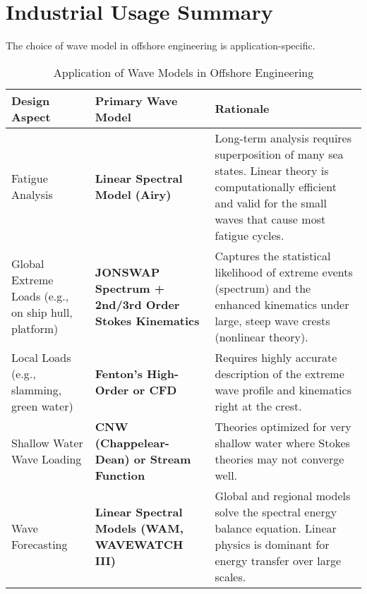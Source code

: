 \documentclass[11pt,a4paper]{article}
\begin{document}
\section{Industrial Usage Summary}
The choice of wave model in offshore engineering is application-specific.
\begin{table}[H]
\centering
\caption{Application of Wave Models in Offshore Engineering}
\begin{tabular}{@{}p{3cm}p{7cm}p{3cm}@{}}
\toprule
Design Aspect & Primary Wave Model & Rationale \\
\midrule
Fatigue Analysis & \textbf{Linear Spectral Model (Airy)} & Long-term analysis requires superposition of many sea states. Linear theory is computationally efficient and valid for the small waves that cause most fatigue cycles. \\
Global Extreme Loads (e.g., on ship hull, platform) & \textbf{JONSWAP Spectrum + 2nd/3rd Order Stokes Kinematics} & Captures the statistical likelihood of extreme events (spectrum) and the enhanced kinematics under large, steep wave crests (nonlinear theory). \\
Local Loads (e.g., slamming, green water) & \textbf{Fenton's High-Order or CFD} & Requires highly accurate description of the extreme wave profile and kinematics right at the crest. \\
Shallow Water Wave Loading & \textbf{CNW (Chappelear-Dean) or Stream Function} & Theories optimized for very shallow water where Stokes theories may not converge well. \\
Wave Forecasting & \textbf{Linear Spectral Models (WAM, WAVEWATCH III)} & Global and regional models solve the spectral energy balance equation. Linear physics is dominant for energy transfer over large scales. \\
\bottomrule
\end{tabular}
\end{table}
\end{document}
